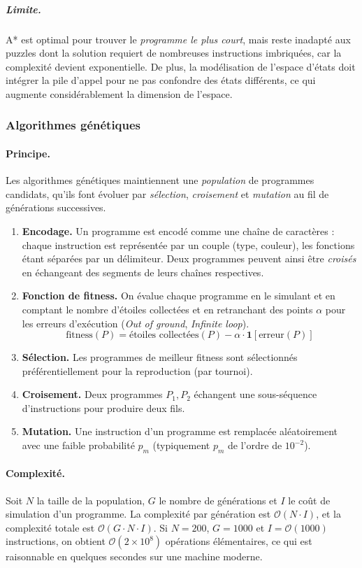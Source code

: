 \subparagraph{Limite.}
A* est optimal pour trouver le \textit{programme le plus court}, mais reste inadapté aux puzzles dont la solution requiert de nombreuses instructions imbriquées, car la complexité devient exponentielle. De plus, la modélisation de l'espace d'états doit intégrer la pile d'appel pour ne pas confondre des états différents, ce qui augmente considérablement la dimension de l'espace.

\subsubsection*{Algorithmes génétiques}

\paragraph{Principe.}
Les algorithmes génétiques maintiennent une \textit{population} de programmes candidats, qu'ils font évoluer par \textit{sélection}, \textit{croisement} et \textit{mutation} au fil de générations successives.

\begin{enumerate}
  \item \textbf{Encodage.} Un programme est encodé comme une chaîne de caractères : chaque instruction est représentée par un couple (type, couleur), les fonctions étant séparées par un délimiteur. Deux programmes peuvent ainsi être \textit{croisés} en échangeant des segments de leurs chaînes respectives.
  \item \textbf{Fonction de fitness.} On évalue chaque programme en le simulant et en comptant le nombre d'étoiles collectées et en retranchant des points $\alpha$ pour les erreurs d'exécution (\textit{Out of ground}, \textit{Infinite loop}).
        \[
          \text{fitness}(P) = \text{étoiles collectées}(P) - \alpha \cdot \mathbf{1}[\text{erreur}(P)]
        \]
  \item \textbf{Sélection.} Les programmes de meilleur fitness sont sélectionnés préférentiellement pour la reproduction (par tournoi).
  \item \textbf{Croisement.} Deux programmes $P_1, P_2$ échangent une sous-séquence d'instructions pour produire deux fils.
  \item \textbf{Mutation.} Une instruction d'un programme est remplacée aléatoirement avec une faible probabilité $p_m$ (typiquement $p_m$ de l'ordre de $10^{-2}$).
\end{enumerate}

\paragraph{Complexité.}
Soit $N$ la taille de la population, $G$ le nombre de générations et $I$ le coût de simulation d'un programme. La complexité par génération est $\mathcal{O}(N \cdot I)$, et la complexité totale est $\mathcal{O}(G \cdot N \cdot I)$. Si $N = 200$, $G = 1000$ et $I = \mathcal{O}(1000)$ instructions, on obtient $\mathcal{O}(2 \times 10^8)$ opérations élémentaires, ce qui est raisonnable en quelques secondes sur une machine moderne.

